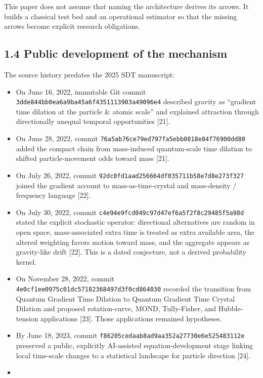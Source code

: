 \documentclass[
  american,
  11pt,
  letterpaper,
]{article}
\providecommand{\tightlist}{%
  \setlength{\itemsep}{0pt}\setlength{\parskip}{0pt}}
\begin{document}
This paper does not assume that naming the architecture derives its arrows. It builds a classical test bed and an operational estimator so that the missing arrows become explicit research obligations.

\subsection{1.4 Public development of the mechanism}\label{public-development-of-the-mechanism}

The source history predates the 2025 SDT manuscript:

\begin{itemize}
\tightlist
\item
  On June 16, 2022, immutable Git commit \nolinkurl{3dde844bb0ea6a9ba45a6f4351113903a49096e4} described gravity as ``gradient time dilation at the particle \& atomic scale'' and explained attraction through directionally unequal temporal opportunities {[}21{]}.
\item
  On June 28, 2022, commit \nolinkurl{76a5ab76ce79ed797fa5ebb0818e84f76900dd80} added the compact chain from mass-induced quantum-scale time dilation to shifted particle-movement odds toward mass {[}21{]}.
\item
  On July 26, 2022, commit \nolinkurl{92dc0fd1aad256664df035711b58e7d8e273f327} joined the gradient account to mass-as-time-crystal and mass-density / frequency language {[}22{]}.
\item
  On July 30, 2022, commit \nolinkurl{c4e94e9fcd049c97d47ef6a5f2f8c29485f5a98d} stated the explicit stochastic operator: directional alternatives are random in open space, mass-associated extra time is treated as extra available area, the altered weighting favors motion toward mass, and the aggregate appears as gravity-like drift {[}22{]}. This is a dated conjecture, not a derived probability kernel.
\item
  On November 28, 2022, commit \nolinkurl{4e0cf1ee0975c01dc57182368497d3f0cd864030} recorded the transition from Quantum Gradient Time Dilation to Quantum Gradient Time Crystal Dilation and proposed rotation-curve, MOND, Tully-Fisher, and Hubble-tension applications {[}23{]}. Those applications remained hypotheses.
\item
  By June 18, 2023, commit \nolinkurl{f86205cedaab8ad9aa352a27730e6e525483112e} preserved a public, explicitly AI-assisted equation-development stage linking local time-scale changes to a statistical landscape for particle direction {[}24{]}.
\item

\end{itemize}
\end{document}
